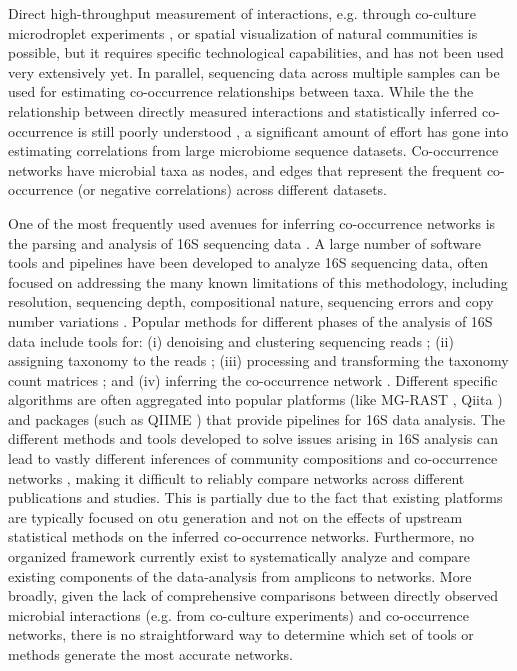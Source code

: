  Direct high-throughput measurement of interactions, e.g. through co-culture microdroplet experiments \cite{Hsu2019,Jian2020}, or spatial visualization of natural communities \cite{Wilbert2020} is possible, but it requires specific technological capabilities, and has not been used very extensively yet.
 In parallel, sequencing data across multiple samples can be used for estimating co-occurrence relationships between taxa.
 While the the relationship between directly measured interactions and statistically inferred co-occurrence is still poorly understood \cite{Zuniga2017}, a significant amount of effort has gone into estimating correlations from large microbiome sequence datasets.
 Co-occurrence networks have microbial taxa as nodes, and edges that represent the frequent co-occurrence (or negative correlations) across different datasets. 

One of the most frequently used avenues for inferring co-occurrence networks is the parsing and analysis of 16S sequencing data \cite{Rottjers2018,Friedman2012}. A large number of software tools and pipelines have been developed to analyze 16S sequencing data, often focused on addressing the many known limitations of this methodology, including resolution, sequencing depth, compositional nature, sequencing errors and copy number variations \cite{Bharti2019,Pollock2018}. Popular methods for different phases of the analysis of 16S data include tools for: (i) denoising and clustering sequencing reads \cite{Caporaso2010,Callahan2016}; (ii) assigning taxonomy to the reads \cite{DeSantis2006,Quast2012}; (iii) processing and transforming the taxonomy count matrices \cite{Weiss2015}; and (iv) inferring the co-occurrence network \cite{Cougoul2019,Kurtz2015}.
Different specific algorithms are often aggregated into popular platforms (like MG-RAST \cite{Keegan2016}, Qiita \cite{qiita}) and packages (such as QIIME \cite{Caporaso2010}) that provide pipelines for 16S data analysis.
The different methods and tools developed to solve issues arising in 16S analysis can lead to vastly different inferences of community compositions and co-occurrence networks \cite{Golob2017,Weiss2016}, making it difficult to reliably compare networks across different publications and studies.
 This is partially due to the fact that existing platforms are typically focused on \ac{otu} generation and not on the effects of upstream statistical methods on the inferred co-occurrence networks.
 Furthermore, no organized framework currently exist to systematically analyze and compare existing components of the data-analysis from amplicons to networks.
  More broadly, given the lack of comprehensive comparisons between directly observed microbial interactions (e.g. from co-culture experiments) and co-occurrence networks, there is no straightforward way to determine which set of tools or methods generate the most accurate networks.
 
